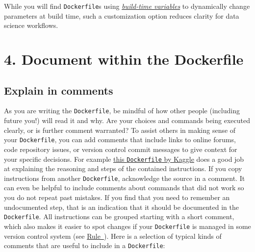 \documentclass[10pt,letterpaper]{article}
\begin{document}
While you will find \texttt{Dockerfile}s using
\href{https://docs.docker.com/engine/reference/commandline/build/\#set-build-time-variables---build-arg}{\emph{build-time
variables}} to dynamically change parameters at build time, such a
customization option reduces clarity for data science workflows.

\hypertarget{document-within-the-dockerfile}{%
\section{4. Document within the
Dockerfile}\label{document-within-the-dockerfile}}

  \label{rule:document} 

\hypertarget{explain-in-comments}{%
\subsection{Explain in comments}\label{explain-in-comments}}

As you are writing the \texttt{Dockerfile}, be mindful of how other
people (including future you!) will read it and why. Are your choices
and commands being executed clearly, or is further comment warranted? To
assist others in making sense of your \texttt{Dockerfile}, you can add
comments that include links to online forums, code repository issues, or
version control commit messages to give context for your specific
decisions. For example
\href{https://github.com/Kaggle/docker-rstats/blob/master/Dockerfile}{this
\texttt{Dockerfile} by Kaggle} does a good job at explaining the
reasoning and steps of the contained instructions. If you copy
instructions from another \texttt{Dockerfile}, acknowledge the source in
a comment. It can even be helpful to include comments about commands
that did not work so you do not repeat past mistakes. If you find that
you need to remember an undocumented step, that is an indication that it
should be documented in the \texttt{Dockerfile}. All instructions can be
grouped starting with a short comment, which also makes it easier to
spot changes if your \texttt{Dockerfile} is managed in some version
control system (see
\hyperref[{rule:publish}]{Rule~}). Here is a
selection of typical kinds of comments that are useful to include in a
\texttt{Dockerfile}:

\footnotesize
\end{document}
